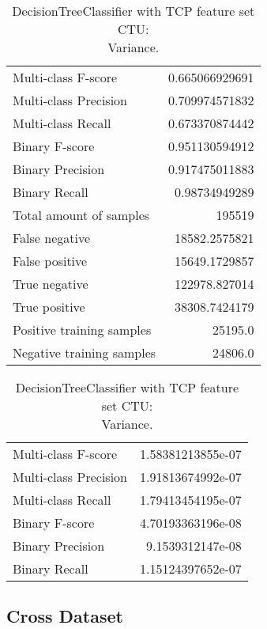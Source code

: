 \begin{table}[H]
\begin{minipage}{0.5\textwidth}
\caption{DecisionTreeClassifier with TCP feature set CTU: \\Average.}
\centering
\begin{tabular}{l r}
\toprule
Multi-class F-score & 0.665066929691 \\
Multi-class Precision & 0.709974571832 \\
Multi-class Recall & 0.673370874442 \\
\midrule
Binary F-score & 0.951130594912 \\
Binary Precision & 0.917475011883 \\
Binary Recall & 0.98734949289 \\
\midrule
Total amount of samples & 195519 \\
False negative & 18582.2575821 \\
False positive & 15649.1729857 \\
True negative & 122978.827014 \\
True positive & 38308.7424179 \\
\midrule
Positive training samples & 25195.0 \\
Negative training samples & 24806.0 \\
\bottomrule
\end{tabular}
\end{minipage}
\hfillx
\begin{minipage}{0.5\textwidth}
\caption{DecisionTreeClassifier with TCP feature set CTU: \\Variance.}
\centering
\begin{tabular}{l r}
\toprule
Multi-class F-score & 1.58381213855e-07 \\
Multi-class Precision & 1.91813674992e-07 \\
Multi-class Recall & 1.79413454195e-07 \\
\midrule
Binary F-score & 4.70193363196e-08 \\
Binary Precision & 9.1539312147e-08 \\
Binary Recall & 1.15124397652e-07 \\
\bottomrule
\end{tabular}
\end{minipage}
\end{table}


\newpage
\subsection{Cross Dataset}

